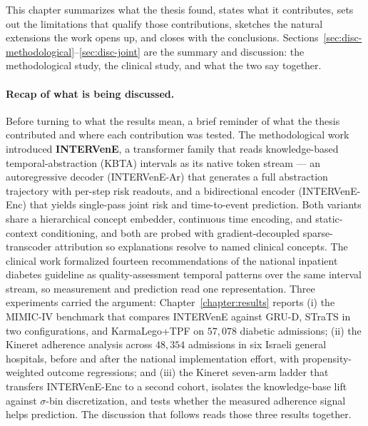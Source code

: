 This chapter summarizes what the thesis found, states what it contributes, sets
out the limitations that qualify those contributions, sketches the natural
extensions the work opens up, and closes with the conclusions.
Sections~\ref{sec:disc-methodological}--\ref{sec:disc-joint} are the summary
and discussion: the methodological study, the clinical study, and what the two
say together.

\paragraph{Recap of what is being discussed.}
Before turning to what the results mean, a brief reminder of what the thesis
contributed and where each contribution was tested. The methodological work
introduced \textbf{INTERVenE}, a transformer family that reads knowledge-based
temporal-abstraction (KBTA) intervals as its native token stream --- an
autoregressive decoder (INTERVenE-Ar) that generates a full abstraction
trajectory with per-step risk readouts, and a bidirectional encoder
(INTERVenE-Enc) that yields single-pass joint risk and time-to-event
prediction. Both variants share a hierarchical concept embedder, continuous
time encoding, and static-context conditioning, and both are probed with
gradient-decoupled sparse-transcoder attribution so explanations resolve to
named clinical concepts. The clinical work formalized fourteen recommendations
of the national inpatient diabetes guideline as quality-assessment temporal
patterns over the same interval stream, so measurement and prediction read one
representation. Three experiments carried the argument:
Chapter~\ref{chapter:results} reports (i) the MIMIC-IV benchmark that compares
INTERVenE against GRU-D, STraTS in two configurations, and KarmaLego+TPF on
$57{,}078$ diabetic admissions; (ii) the Kineret adherence analysis across
$48{,}354$ admissions in six Israeli general hospitals, before and after the
national implementation effort, with propensity-weighted outcome regressions;
and (iii) the Kineret seven-arm ladder that transfers INTERVenE-Enc to a
second cohort, isolates the knowledge-base lift against $\sigma$-bin
discretization, and tests whether the measured adherence signal helps
prediction. The discussion that follows reads those three results together.



